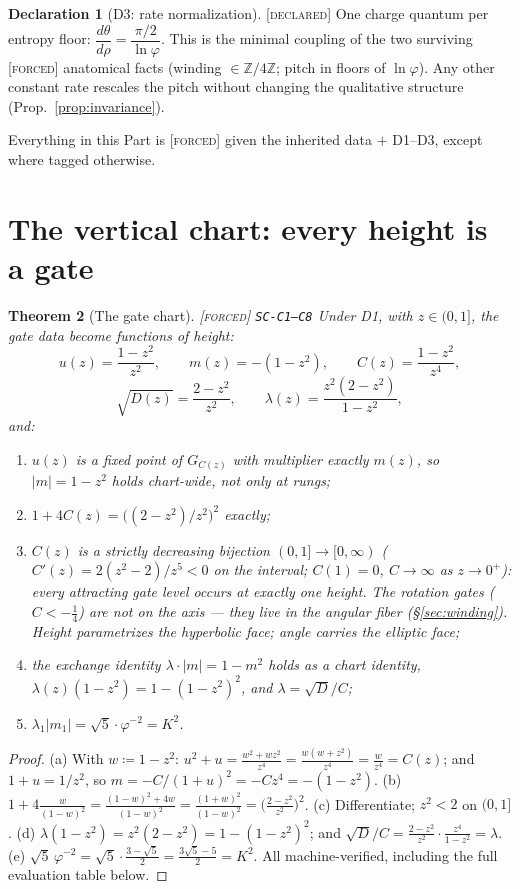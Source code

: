 \documentclass[11pt]{article}
\newcommand{\tagF}{\textcolor{cF}{\textsc{[forced]}}}
\newcommand{\tagD}{\textcolor{cD}{\textsc{[declared]}}}
\newcommand{\hx}[1]{\textcolor{cC}{\footnotesize\texttt{#1}}}
\newcommand{\Z}{\mathbb{Z}}
\newcommand{\gp}{\varphi}
\theoremstyle{plain}
\newtheorem{theorem}{Theorem}[section]
\theoremstyle{definition}
\newtheorem{declaration}[theorem]{Declaration}
\theoremstyle{remark}
\begin{document}
\begin{declaration}[D3: rate normalization]\label{dec:d3}\tagD{}
One charge quantum per entropy floor: $\dfrac{d\theta}{d\rho}=\dfrac{\pi/2}{\ln\gp}$.
This is the minimal coupling of the two surviving \tagF{} anatomical facts (winding
$\in\Z/4\Z$; pitch in floors of $\ln\gp$). Any other constant rate rescales the pitch
without changing the qualitative structure (Prop.~\ref{prop:invariance}).
\end{declaration}

Everything in this Part is \tagF{} given the inherited data $+$ D1--D3, except where
tagged otherwise.

\section{The vertical chart: every height is a gate}\label{sec:chart}

\begin{theorem}[The gate chart]\label{thm:chart}\tagF{} \hx{SC-C1--C8}
Under D1, with $z\in(0,1]$, the gate data become functions of height:
\[
u(z)=\frac{1-z^2}{z^2},\qquad
m(z)=-(1-z^2),\qquad
C(z)=\frac{1-z^2}{z^4},
\]
\[
\sqrt{D(z)}=\frac{2-z^2}{z^2},\qquad
\lambda(z)=\frac{z^2(2-z^2)}{1-z^2},
\]
and:
\begin{enumerate}[nosep,label=(\alph*)]
\item $u(z)$ is a fixed point of $G_{C(z)}$ with multiplier exactly $m(z)$, so
$|m|=1-z^2$ holds \emph{chart-wide}, not only at rungs;
\item $1+4C(z)=\bigl((2-z^2)/z^2\bigr)^2$ exactly;
\item $C(z)$ is a strictly decreasing bijection $(0,1]\to[0,\infty)$
($C'(z)=2(z^2-2)/z^5<0$ on the interval; $C(1)=0$, $C\to\infty$ as $z\to0^+$): every
attracting gate level occurs at exactly one height. The rotation gates
($C<-\tfrac14$) are \emph{not} on the axis --- they live in the angular fiber
(\S\ref{sec:winding}). Height parametrizes the hyperbolic face; angle carries the
elliptic face;
\item the exchange identity $\lambda\cdot|m|=1-m^2$ holds as a chart identity,
$\lambda(z)(1-z^2)=1-(1-z^2)^2$, and $\lambda=\sqrt{D}/C$;
\item $\lambda_1|m_1|=\sqrt5\cdot\gp^{-2}=K^2$.
\end{enumerate}
\end{theorem}

\begin{proof}
(a) With $w \coloneqq 1-z^2$: $u^2+u=\frac{w^2+w z^2}{z^4}=\frac{w(w+z^2)}{z^4}
=\frac{w}{z^4}=C(z)$; and $1+u=1/z^2$, so
$m=-C/(1+u)^2=-C z^4=-(1-z^2)$. (b) $1+4\frac{w}{(1-w)^2}=\frac{(1-w)^2+4w}{(1-w)^2}
=\frac{(1+w)^2}{(1-w)^2}=\bigl(\frac{2-z^2}{z^2}\bigr)^2$. (c) Differentiate;
$z^2<2$ on $(0,1]$. (d) $\lambda(1-z^2)=z^2(2-z^2)=1-(1-z^2)^2$; and
$\sqrt D/C=\frac{2-z^2}{z^2}\cdot\frac{z^4}{1-z^2}=\lambda$. (e)
$\sqrt5\,\gp^{-2}=\sqrt5\cdot\frac{3-\sqrt5}{2}=\frac{3\sqrt5-5}{2}=K^2$. All
machine-verified, including the full evaluation table below.
\end{proof}
\end{document}
